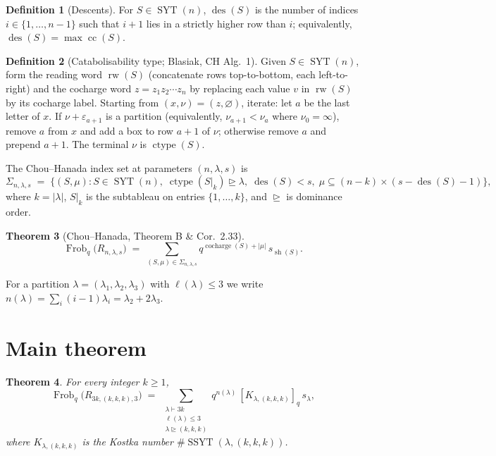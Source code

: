 \documentclass[11pt]{article}
\newtheorem{theorem}{Theorem}
\theoremstyle{definition}
\newtheorem{definition}[theorem]{Definition}
\theoremstyle{remark}
\DeclareMathOperator{\Frob}{Frob}
\DeclareMathOperator{\ctype}{ctype}
\DeclareMathOperator{\cocharge}{cocharge}
\DeclareMathOperator{\cc}{cc}
\DeclareMathOperator{\des}{des}
\DeclareMathOperator{\rw}{rw}
\DeclareMathOperator{\sh}{sh}
\DeclareMathOperator{\SYT}{SYT}
\DeclareMathOperator{\SSYT}{SSYT}
\newcommand{\dom}{\trianglerighteq}
\begin{document}
\begin{definition}[Descents]\label{def:des}
For $S \in \SYT(n)$, $\des(S)$ is the number of indices
$i \in \{1,\ldots,n-1\}$ such that $i+1$ lies in a strictly higher row than
$i$; equivalently, $\des(S) = \max \cc(S)$.
\end{definition}

\begin{definition}[Catabolisability type; Blasiak, CH Alg.~1]\label{def:ctype}
Given $S \in \SYT(n)$, form the reading word $\rw(S)$ (concatenate rows
top-to-bottom, each left-to-right) and the cocharge word
$z = z_1 z_2 \cdots z_n$ by replacing each value $v$ in $\rw(S)$ by its
cocharge label. Starting from $(x,\nu) = (z, \varnothing)$, iterate: let $a$
be the last letter of $x$. If $\nu + \varepsilon_{a+1}$ is a partition
(equivalently, $\nu_{a+1} < \nu_a$ where $\nu_0 = \infty$), remove $a$ from
$x$ and add a box to row $a+1$ of $\nu$; otherwise remove $a$ and prepend
$a+1$. The terminal $\nu$ is $\ctype(S)$.
\end{definition}

The Chou--Hanada index set at parameters $(n,\lambda,s)$ is
\[
    \Sigma_{n,\lambda,s}
    \;=\; \bigl\{(S,\mu) : S \in \SYT(n),\;
        \ctype(S|_k) \dom \lambda,\; \des(S) < s,\;
        \mu \subseteq (n-k)\times(s - \des(S) - 1)\bigr\},
\]
where $k = |\lambda|$, $S|_k$ is the subtableau on entries $\{1,\ldots,k\}$,
and $\dom$ is dominance order.

\begin{theorem}[Chou--Hanada, Theorem B \& Cor.~2.33]\label{thm:CH}
\[
    \Frob_q\bigl(R_{n,\lambda,s}\bigr)
    \;=\; \sum_{(S,\mu)\in\Sigma_{n,\lambda,s}}
        q^{\cocharge(S) + |\mu|}\, s_{\sh(S)}.
\]
\end{theorem}

For a partition $\lambda = (\lambda_1,\lambda_2,\lambda_3)$ with $\ell(\lambda) \le 3$
we write $n(\lambda) = \sum_i (i-1)\lambda_i = \lambda_2 + 2\lambda_3$.

\section{Main theorem}

\begin{theorem}\label{thm:main}
For every integer $k \ge 1$,
\[
    \Frob_q\bigl(R_{3k,(k,k,k),3}\bigr)
    \;=\;
    \sum_{\substack{\lambda\vdash 3k\\ \ell(\lambda)\le 3\\ \lambda\dom(k,k,k)}}
        q^{n(\lambda)}\,[K_{\lambda,(k,k,k)}]_q\, s_\lambda,
\]
where $K_{\lambda,(k,k,k)}$ is the Kostka number
$\#\SSYT(\lambda,(k,k,k))$.
\end{theorem}
\end{document}
